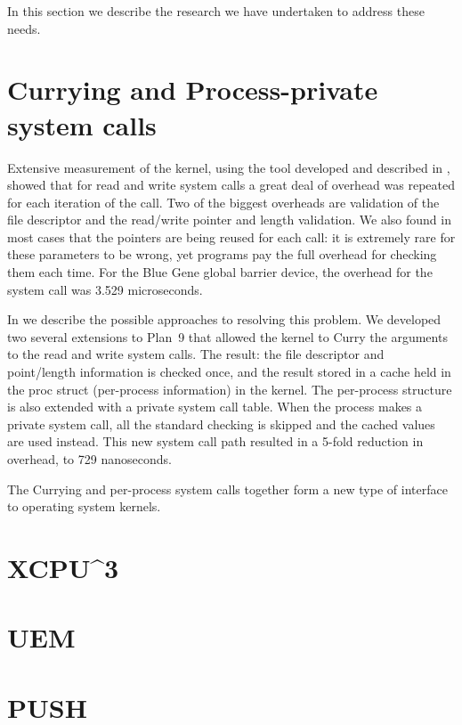In this section we describe the research we have undertaken to address these needs. 

\section{Currying and Process-private system calls}
Extensive measurement of the kernel, using the tool developed and described in \cite{plan9trace}, showed
that for read and write system calls a great deal of overhead was repeated for each iteration of the 
call. Two of the biggest overheads are validation of the file descriptor and the read/write pointer and 
length validation. We also found in most cases that the pointers are being reused for each call: it is extremely rare for these parameters to be wrong, yet programs pay the full overhead for checking them 
each time. For the Blue Gene global barrier device, the overhead for the system call was 3.529 microseconds. 

In \cite{currying} we describe the possible approaches to resolving this problem. We developed two 
several extensions to Plan~9 that allowed the kernel to Curry the arguments to the read and write
system calls. The result: the file descriptor and point/length information is checked once, and the
result stored in a cache held in the proc struct (per-process information) in the kernel. The per-process structure is 
also extended with a private system call table. When the process makes a private system
call, all the standard checking is skipped and the cached values are used instead. This 
new system call path resulted in a 5-fold reduction in overhead, to 729 nanoseconds. 

The Currying and per-process system calls together form a new type of interface to operating system
kernels. 


\section{XCPU^3}
\section{UEM}
\section{PUSH}
